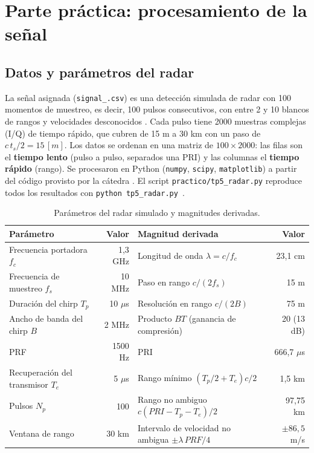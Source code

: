 \section{Parte práctica: procesamiento de la señal \senal}
\label{sec:practico}

\subsection{Datos y parámetros del radar}
\label{sec:parametros}
La señal asignada (\texttt{signal\_\senal.csv}) es una detección simulada de radar con 100 momentos de muestreo, es decir, 100 pulsos consecutivos, con entre 2 y 10 blancos de rangos y velocidades desconocidos \cite{consigna}. Cada pulso tiene 2000 muestras complejas (I/Q) de tiempo rápido, que cubren de 15 m a 30 km con un paso de $c\,t_s/2 = 15 \, [m]$. Los datos se ordenan en una matriz de $100 \times 2000$: las filas son el \textbf{tiempo lento} (pulso a pulso, separados una PRI) y las columnas el \textbf{tiempo rápido} (rango). Se procesaron en Python (\texttt{numpy}, \texttt{scipy}, \texttt{matplotlib}) a partir del código provisto por la cátedra \cite{codigo_catedra}. El script \texttt{practico/tp5\_radar.py} reproduce todos los resultados con \texttt{python tp5\_radar.py \senal}.

\begin{table}[H]
    \centering
    \footnotesize
    \caption{Parámetros del radar simulado \cite{codigo_catedra} y magnitudes derivadas.}
    \label{tab:parametros}
    \begin{tabular}{|l|r||l|r|}
        \hline
        \textbf{Parámetro} & \textbf{Valor} & \textbf{Magnitud derivada} & \textbf{Valor} \\
        \hline
        Frecuencia portadora $f_c$ & 1,3 GHz & Longitud de onda $\lambda = c/f_c$ & 23,1 cm \\
        Frecuencia de muestreo $f_s$ & 10 MHz & Paso en rango $c/(2f_s)$ & 15 m \\
        Duración del chirp $T_p$ & 10 $\mu$s & Resolución en rango $c/(2B)$ & 75 m \\
        Ancho de banda del chirp $B$ & 2 MHz & Producto $BT$ (ganancia de compresión) & 20 (13 dB) \\
        PRF & 1500 Hz & PRI & 666,7 $\mu$s \\
        Recuperación del transmisor $T_e$ & 5 $\mu$s & Rango mínimo $(T_p/2 + T_e)c/2$ & 1,5 km \\
        Pulsos $N_p$ & 100 & Rango no ambiguo $c(PRI - T_p - T_e)/2$ & 97,75 km \\
        Ventana de rango & 30 km & Intervalo de velocidad no ambigua $\pm \lambda\,PRF/4$ & $\pm 86{,}5$ m/s \\
        \hline
    \end{tabular}
\end{table}

